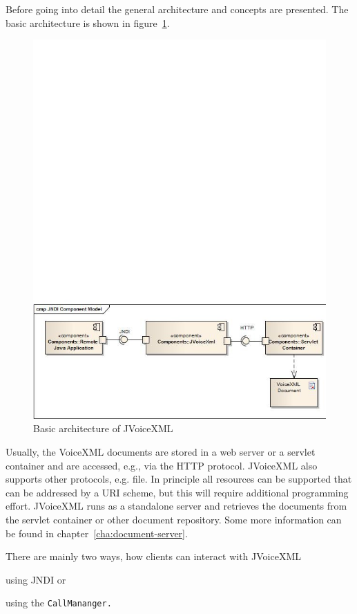\documentclass[11pt,a4paper]{book}
\begin{document}
Before going into detail the general architecture and concepts are presented.
The basic architecture is shown in figure~\ref{fig:architecture}.
\begin{figure}
\includegraphics[width=\linewidth]{client-architecture.jpg}
\caption{Basic architecture of JVoiceXML}
\label{fig:architecture}
\end{figure}

Usually, the VoiceXML documents are stored in a web server or a servlet
container and are accessed, e.g., via the HTTP protocol. JVoiceXML also
supports other protocols, e.g. file. In principle all resources can be supported
that can be addressed by a URI scheme, but this will require additional
programming effort. JVoiceXML runs as a
standalone server and retrieves the documents from the servlet container or
other document repository. Some more information can be found in
chapter~\ref{cha:document-server}. 

There are mainly two ways, how clients can interact with JVoiceXML
\begin{inparaenum}[(i)]
\item using JNDI or
\item using the \lstinline{CallMananger.}
\end{inparaenum}
\end{document}
